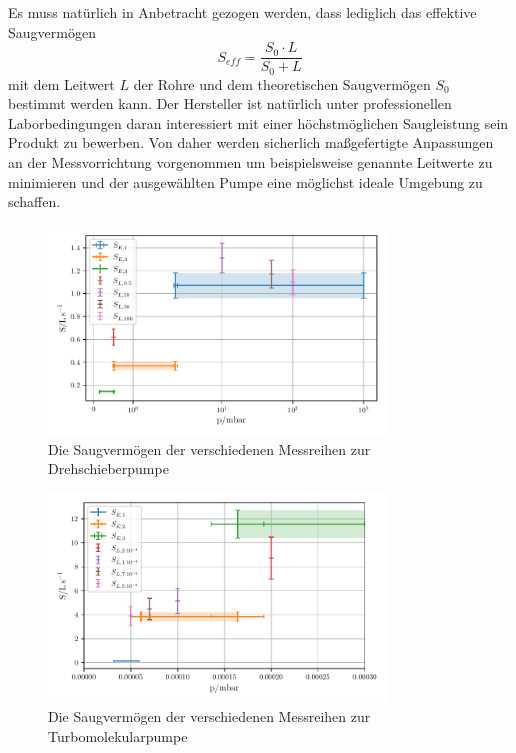 Es muss natürlich in Anbetracht gezogen werden, dass lediglich das effektive Saugvermögen
\begin{equation*}
    S_{eff} = \frac{S_0\cdot L}{S_0 + L}
\end{equation*}
mit dem Leitwert $L$ der Rohre und dem theoretischen Saugvermögen $S_0$ bestimmt werden kann.
Der Hersteller ist natürlich unter professionellen Laborbedingungen daran interessiert mit einer höchstmöglichen Saugleistung sein Produkt zu bewerben.
Von daher werden sicherlich maßgefertigte Anpassungen an der Messvorrichtung vorgenommen um beispielsweise genannte Leitwerte zu minimieren und
der ausgewählten Pumpe eine möglichst ideale Umgebung zu schaffen.
\begin{figure}
    \centering
    \includegraphics[width=0.8\textwidth]{abb/plot1.pdf}
    \caption{Die Saugvermögen der verschiedenen Messreihen zur Drehschieberpumpe}
    \label{fig:dreh}
\end{figure}
\begin{figure}
    \centering
    \includegraphics[width=0.8\textwidth]{abb/plot2.pdf}
    \caption{Die Saugvermögen der verschiedenen Messreihen zur Turbomolekularpumpe}
    \label{fig:turbo}
\end{figure}

\newpage

